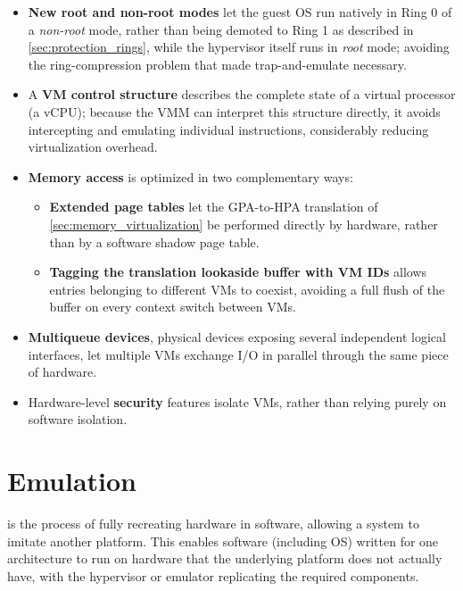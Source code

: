 \begin{itemize}
    \item \textbf{New root and non-root modes} let the guest OS run natively in Ring 0 of a \textit{non-root} mode, rather than being demoted to Ring 1 as described in \cref{sec:protection_rings}, while the hypervisor itself runs in \textit{root} mode; avoiding the ring-compression problem that made trap-and-emulate necessary.
    \item A \textbf{VM control structure} describes the complete state of a virtual processor (a vCPU); because the VMM can interpret this structure directly, it avoids intercepting and emulating individual instructions, considerably reducing virtualization overhead.
    \item \textbf{Memory access} is optimized in two complementary ways: 
    \begin{itemize}
        \item \textbf{Extended page tables} let the GPA-to-HPA translation of \cref{sec:memory_virtualization} be performed directly by hardware, rather than by a software shadow page table.
        \item \textbf{Tagging the translation lookaside buffer with VM IDs} allows entries belonging to different VMs to coexist, avoiding a full flush of the buffer on every context switch between VMs.
    \end{itemize}
    \item \textbf{Multiqueue devices}, physical devices exposing several independent logical interfaces, let multiple VMs exchange I/O in parallel through the same piece of hardware.
    \item Hardware-level \textbf{security} features isolate VMs, rather than relying purely on software isolation.
\end{itemize}

\vspace{-0.5em}

\section{Emulation} \label{sec:emulation}

\begin{definitionblock}[Emulation]
     is the process of fully recreating hardware in software, allowing a system to imitate another platform. This enables software (including OS) written for one architecture to run on hardware that the underlying platform does not actually have, with the hypervisor or emulator replicating the required components.
\end{definitionblock}

